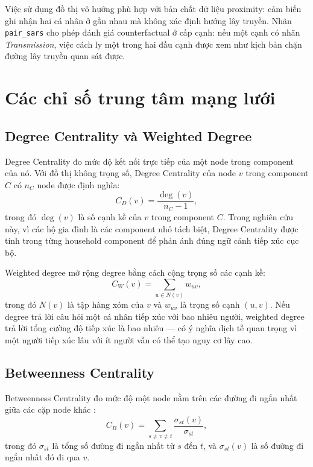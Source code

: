 \documentclass[12pt,a4paper]{report}
\theoremstyle{definition}
\begin{document}
Việc sử dụng đồ thị vô hướng phù hợp với bản chất dữ liệu proximity: cảm biến ghi nhận hai cá nhân ở gần nhau mà không xác định hướng lây truyền. Nhãn \texttt{pair\_sars} cho phép đánh giá counterfactual ở cấp cạnh: nếu một cạnh có nhãn \textit{Transmission}, việc cách ly một trong hai đầu cạnh được xem như kịch bản chặn đường lây truyền quan sát được.

\section{Các chỉ số trung tâm mạng lưới}

\subsection{Degree Centrality và Weighted Degree}

Degree Centrality đo mức độ kết nối trực tiếp của một node trong component của nó. Với đồ thị không trọng số, Degree Centrality của node $v$ trong component $C$ có $n_C$ node được định nghĩa:
\begin{equation}
  C_D(v) = \frac{\deg(v)}{n_C - 1},
  \label{eq:degree_centrality}
\end{equation}
trong đó $\deg(v)$ là số cạnh kề của $v$ trong component $C$. Trong nghiên cứu này, vì các hộ gia đình là các component nhỏ tách biệt, Degree Centrality được tính trong từng household component để phản ánh đúng ngữ cảnh tiếp xúc cục bộ.

Weighted degree mở rộng degree bằng cách cộng trọng số các cạnh kề:
\begin{equation}
  C_W(v) = \sum_{u \in N(v)} w_{uv},
  \label{eq:weighted_degree}
\end{equation}
trong đó $N(v)$ là tập hàng xóm của $v$ và $w_{uv}$ là trọng số cạnh $(u,v)$. Nếu degree trả lời câu hỏi một cá nhân tiếp xúc với bao nhiêu người, weighted degree trả lời tổng cường độ tiếp xúc là bao nhiêu --- có ý nghĩa dịch tễ quan trọng vì một người tiếp xúc lâu với ít người vẫn có thể tạo nguy cơ lây cao.

\subsection{Betweenness Centrality}

Betweenness Centrality đo mức độ một node nằm trên các đường đi ngắn nhất giữa các cặp node khác \cite{freeman1977}:
\begin{equation}
  C_B(v) = \sum_{s \neq v \neq t} \frac{\sigma_{st}(v)}{\sigma_{st}},
  \label{eq:betweenness}
\end{equation}
trong đó $\sigma_{st}$ là tổng số đường đi ngắn nhất từ $s$ đến $t$, và $\sigma_{st}(v)$ là số đường đi ngắn nhất đó đi qua $v$.
\end{document}
